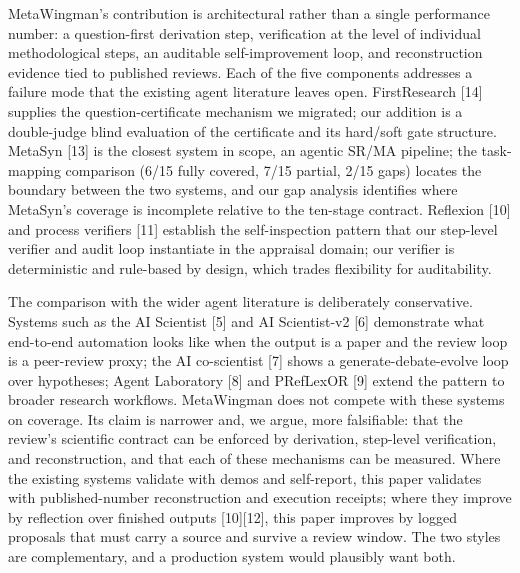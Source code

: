 \documentclass[
]{article}
\begin{document}
MetaWingman's contribution is architectural rather than a single
performance number: a question-first derivation step, verification at
the level of individual methodological steps, an auditable
self-improvement loop, and reconstruction evidence tied to published
reviews. Each of the five components addresses a failure mode that the
existing agent literature leaves open. FirstResearch {[}14{]} supplies
the question-certificate mechanism we migrated; our addition is a
double-judge blind evaluation of the certificate and its hard/soft gate
structure. MetaSyn {[}13{]} is the closest system in scope, an agentic
SR/MA pipeline; the task-mapping comparison (6/15 fully covered, 7/15
partial, 2/15 gaps) locates the boundary between the two systems, and
our gap analysis identifies where MetaSyn's coverage is incomplete
relative to the ten-stage contract. Reflexion {[}10{]} and process
verifiers {[}11{]} establish the self-inspection pattern that our
step-level verifier and audit loop instantiate in the appraisal domain;
our verifier is deterministic and rule-based by design, which trades
flexibility for auditability.

The comparison with the wider agent literature is deliberately
conservative. Systems such as the AI Scientist {[}5{]} and AI
Scientist-v2 {[}6{]} demonstrate what end-to-end automation looks like
when the output is a paper and the review loop is a peer-review proxy;
the AI co-scientist {[}7{]} shows a generate-debate-evolve loop over
hypotheses; Agent Laboratory {[}8{]} and PRefLexOR {[}9{]} extend the
pattern to broader research workflows. MetaWingman does not compete with
these systems on coverage. Its claim is narrower and, we argue, more
falsifiable: that the review's scientific contract can be enforced by
derivation, step-level verification, and reconstruction, and that each
of these mechanisms can be measured. Where the existing systems validate
with demos and self-report, this paper validates with published-number
reconstruction and execution receipts; where they improve by reflection
over finished outputs {[}10{]}{[}12{]}, this paper improves by logged
proposals that must carry a source and survive a review window. The two
styles are complementary, and a production system would plausibly want
both.
\end{document}
